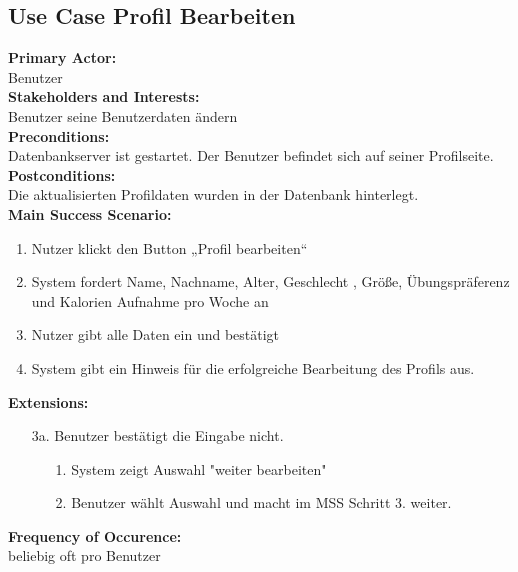 \documentclass[12pt,a4paper,onecolumn]{article}
\begin{document}
\subsection{Use Case Profil Bearbeiten}
\textbf{Primary Actor:}\\ Benutzer\\
\textbf{Stakeholders and Interests:}\\
Benutzer seine Benutzerdaten ändern\\
\textbf{Preconditions:} \\ Datenbankserver ist gestartet. Der Benutzer befindet sich auf seiner Profilseite.\\
\textbf{Postconditions:}\\ Die aktualisierten Profildaten wurden in der Datenbank hinterlegt.\\
\textbf{Main Success Scenario:}
\begin{enumerate}
    \item Nutzer klickt den Button „Profil bearbeiten“
    \item System fordert Name, Nachname, Alter, Geschlecht , Größe, Übungspräferenz und Kalorien Aufnahme pro Woche an
    \item Nutzer gibt alle Daten ein und bestätigt
    \item System gibt ein Hinweis für die erfolgreiche Bearbeitung des Profils aus.
\end{enumerate}
\textbf{Extensions:}\\
\begin{enumerate}
    \item [3a.]Benutzer bestätigt die Eingabe nicht.
    \begin{enumerate}
        \item [1.]System zeigt Auswahl "weiter bearbeiten"\\
        \item [2.]Benutzer wählt Auswahl und macht im MSS Schritt 3. weiter.\\
    \end{enumerate}
\end{enumerate} 
\textbf{Frequency of Occurence:}\\ beliebig oft pro Benutzer\\
\end{document}
